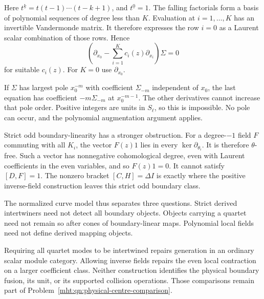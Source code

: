 Here $t^{\underline{k}}=t(t-1)\cdots(t-k+1)$, and
$t^{\underline{0}}=1$. The falling factorials form a
basis of polynomial sequences of degree less than $K$.
Evaluation at $i=1,\ldots,K$ has an invertible Vandermonde
matrix. It therefore expresses the row $i=0$ as a
Laurent scalar combination of those rows. Hence
\[
 \left(\partial_{x_0}-\sum_{i=1}^K
                    c_i(z)\partial_{x_i}\right)\Sigma=0
\]
for suitable $c_i(z)$. For $K=0$ use $\partial_{x_0}$.

If $\Sigma$ has largest pole $x_0^{-m}$ with coefficient
$\Sigma_{-m}$ independent of $x_0$, the last equation
has coefficient $-m\Sigma_{-m}$ at $x_0^{-m-1}$.
The other derivatives cannot increase that pole order.
Positive integers are units in $S_\ell$, so this is
impossible. No pole can occur, and the polynomial
augmentation argument applies.

Strict odd boundary-linearity has a stronger obstruction.
For a degree-$-1$ field $F$ commuting with all $K_i$,
the vector $F(z)1$ lies in every $\ker\partial_{\theta_i}$.
It is therefore $\theta$-free. Such a vector has
nonnegative cohomological degree, even with Laurent
coefficients in the even variables, and so $F(z)1=0$.
It cannot satisfy $[D,F]=1$. The nonzero bracket
$[C,H]=\Delta I$ is exactly where the positive
inverse-field construction leaves this strict odd
boundary class.

The normalized curve model thus separates three
questions. Strict derived intertwiners need not detect
all boundary objects. Objects carrying a quartet need
not remain so after cones of boundary-linear maps.
Polynomial local fields need not define derived
mapping objects.

Requiring all quartet modes to be
intertwined repairs generation in an ordinary scalar
module category. Allowing inverse fields repairs the
even local contraction on a larger coefficient class.
Neither construction identifies the physical boundary
fusion, its unit, or its supported collision operations.
Those comparisons remain part of
Problem~\ref{mht:qn:physical-centre-comparison}.
